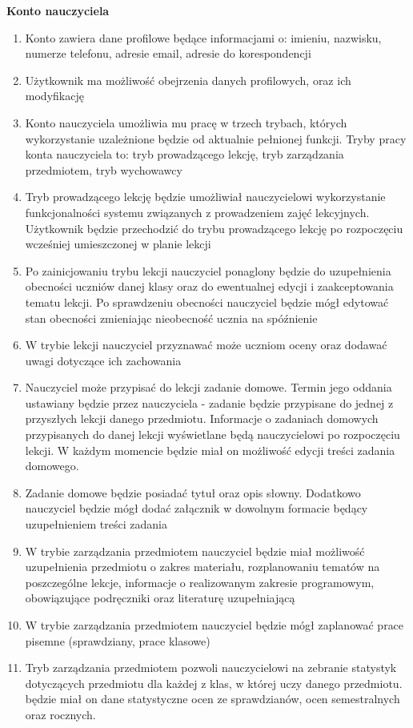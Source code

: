 \documentclass{article}
\begin{document}
\textbf{Konto nauczyciela}
\begin{enumerate}
  \item Konto zawiera dane profilowe będące informacjami o: imieniu, nazwisku, numerze telefonu, adresie email, adresie do korespondencji
  \item Użytkownik ma możliwość obejrzenia danych profilowych, oraz ich modyfikację
  \item Konto nauczyciela umożliwia mu pracę w trzech trybach, których wykorzystanie uzależnione będzie od aktualnie pełnionej funkcji. Tryby pracy konta nauczyciela to: tryb prowadzącego lekcję, tryb zarządzania przedmiotem, tryb wychowawcy
  \item Tryb prowadzącego lekcję będzie umożliwiał nauczycielowi wykorzystanie funkcjonalności systemu związanych z prowadzeniem zajęć lekcyjnych. Użytkownik będzie przechodzić do trybu prowadzącego lekcję po rozpoczęciu wcześniej umieszczonej w planie lekcji
  \item Po zainicjowaniu trybu lekcji nauczyciel ponaglony będzie do uzupełnienia obecności uczniów danej klasy oraz do ewentualnej edycji i zaakceptowania tematu lekcji. Po sprawdzeniu obecności nauczyciel będzie mógł edytować stan obecności zmieniając nieobecność ucznia na spóźnienie
  \item W trybie lekcji nauczyciel przyznawać może uczniom oceny oraz dodawać uwagi dotyczące ich zachowania
  \item Nauczyciel może przypisać do lekcji zadanie domowe. Termin jego oddania ustawiany będzie przez nauczyciela - zadanie będzie przypisane do jednej z przyszłych lekcji danego przedmiotu. Informacje o zadaniach domowych przypisanych do danej lekcji wyświetlane będą nauczycielowi po rozpoczęciu lekcji. W każdym momencie będzie miał on możliwość edycji treści zadania domowego.
  \item Zadanie domowe będzie posiadać tytuł oraz opis słowny. Dodatkowo nauczyciel będzie mógł dodać załącznik w dowolnym formacie będący uzupełnieniem treści zadania
  \item W trybie zarządzania przedmiotem nauczyciel będzie miał możliwość uzupełnienia przedmiotu o zakres materiału, rozplanowaniu tematów na poszczególne lekcje, informacje o realizowanym zakresie programowym, obowiązujące podręczniki oraz literaturę uzupełniającą
  \item W trybie zarządzania przedmiotem nauczyciel będzie mógł zaplanować prace pisemne (sprawdziany, prace klasowe)
  \item Tryb zarządzania przedmiotem pozwoli nauczycielowi na zebranie statystyk dotyczących przedmiotu dla każdej z klas, w której uczy danego przedmiotu. będzie miał on dane statystyczne ocen ze sprawdzianów, ocen semestralnych oraz rocznych.

\end{enumerate}
\end{document}
